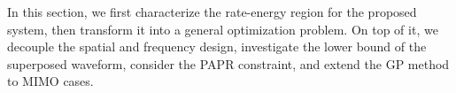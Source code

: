 In this section, we first characterize the rate-energy region for the proposed system, then transform it into a general optimization problem. On top of it, we decouple the spatial and frequency design, investigate the lower bound of the superposed waveform, consider the PAPR constraint, and extend the GP method to MIMO cases.